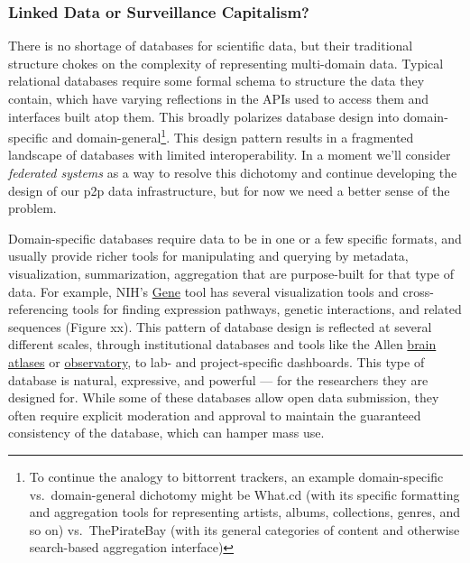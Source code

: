 \documentclass[10pt]{article}
\begin{document}
\hypertarget{linked-data-or-surveillance-capitalism}{%
\subsubsection{Linked Data or Surveillance
Capitalism?}\label{linked-data-or-surveillance-capitalism}}


\begin{multicols}{2}
 There is no shortage of databases for scientific data, but
their traditional structure chokes on the complexity of representing
multi-domain data. Typical relational databases require some formal
schema to structure the data they contain, which have varying
reflections in the APIs used to access them and interfaces built atop
them. This broadly polarizes database design into domain-specific and
domain-general\footnote{To continue the analogy to bittorrent trackers,
  an example domain-specific vs.~domain-general dichotomy might be
  What.cd (with its specific formatting and aggregation tools for
  representing artists, albums, collections, genres, and so on)
  vs.~ThePirateBay (with its general categories of content and otherwise
  search-based aggregation interface)}. This design pattern results in a
fragmented landscape of databases with limited interoperability. In a
moment we'll consider \emph{federated systems} as a way to resolve this
dichotomy and continue developing the design of our p2p data
infrastructure, but for now we need a better sense of the problem.

Domain-specific databases require data to be in one or a few specific
formats, and usually provide richer tools for manipulating and querying
by metadata, visualization, summarization, aggregation that are
purpose-built for that type of data. For example, NIH's
\href{https://www.ncbi.nlm.nih.gov/gene/12550}{Gene} tool has several
visualization tools and cross-referencing tools for finding expression
pathways, genetic interactions, and related sequences (Figure xx). This
pattern of database design is reflected at several different scales,
through institutional databases and tools like the Allen
\href{https://connectivity.brain-map.org/}{brain atlases} or
\href{http://observatory.brain-map.org/visualcoding/}{observatory}, to
lab- and project-specific dashboards. This type of database is natural,
expressive, and powerful --- for the researchers they are designed for.
While some of these databases allow open data submission, they often
require explicit moderation and approval to maintain the guaranteed
consistency of the database, which can hamper mass use.


\end{multicols}
\end{document}
